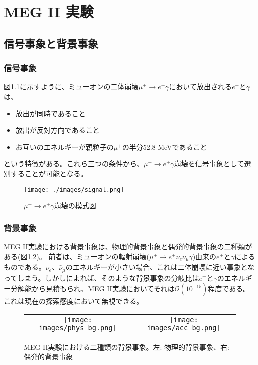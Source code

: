 \documentclass[Yonemoto_master.tex]{subfiles}
\begin{document}
\chapter{MEG II 実験}
\section{信号事象と背景事象}

\subsection{信号事象}
図\ref{fig: signal}に示すように、ミューオンの二体崩壊$\mu^+ \to e^+ \gamma$において放出される$e^+$と$\gamma$は、

\begin{itemize}
\item 放出が同時であること
\item 放出が反対方向であること
\item お互いのエネルギーが親粒子の$\mu^+$の半分52.8 MeVであること
\end{itemize}

という特徴がある。これら三つの条件から、$\mu^+ \to e^+ \gamma$崩壊を信号事象として選別することが可能となる。

\begin{figure}[h]
 \begin{center}
  \texttt{[image: ./images/signal.png]}
  \caption{$\mu^+ \to e^+ \gamma$崩壊の模式図}
  \label{fig: signal}
 \end{center}
\end{figure}

\subsection{背景事象}
MEG II実験における背景事象は、物理的背景事象と偶発的背景事象の二種類がある(図\ref{fig: bg})。
前者は、ミューオンの輻射崩壊($\mu^+ \to e^+\nu_e\bar{\nu}_{\mu}\gamma$)由来の$e^+$と$\gamma$によるものである。$\nu_e$、$\bar{\nu}_{\mu}$のエネルギーが小さい場合、これは二体崩壊に近い事象となってしまう。しかし\cite{phys_bg}によれば、そのような背景事象の分岐比は$e^+$と$\gamma$のエネルギー分解能から見積もられ、MEG II実験においてそれは$\mathcal{O}(10^{-15})$程度である。これは現在の探索感度において無視できる。

\begin{figure}[h]
    \begin{tabular}{cc}
      \begin{minipage}[t]{0.45\hsize}
        \raggedleft
        \texttt{[image: images/phys\_bg.png]}
      \end{minipage} &
      \begin{minipage}[t]{0.45\hsize}
        \raggedright
        \texttt{[image: images/acc\_bg.png]}
      \end{minipage}
    \end{tabular}
    \caption{MEG II実験における二種類の背景事象。左: 物理的背景事象、右: 偶発的背景事象}
    \label{fig: bg}
\end{figure}
\end{document}
